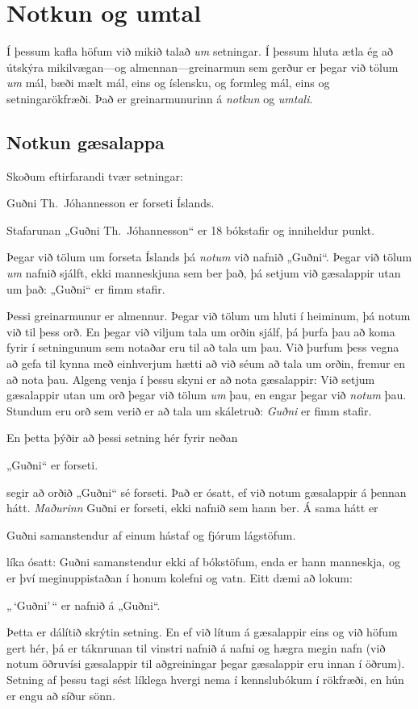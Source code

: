 \chapter{Notkun og umtal}\label{s:UseMention}

Í þessum kafla höfum við mikið talað \emph{um} setningar. Í þessum hluta ætla ég að útskýra mikilvægan---og almennan---greinarmun sem gerður er þegar við tölum \emph{um} mál, bæði mælt mál, eins og íslensku, og formleg mál, eins og setningarökfræði. Það er greinarmunurinn á \emph{notkun} og \emph{umtali}.

\section{Notkun gæsalappa}
Skoðum eftirfarandi tvær setningar:
	\begin{ebullet}
		\item Guðni Th.\ Jóhannesson er forseti Íslands.
		\item Stafarunan „Guðni Th.\ Jóhannesson“ er 18 bókstafir og inniheldur punkt.
	\end{ebullet}
Þegar við tölum um forseta Íslands þá \emph{notum} við nafnið „Guðni“. Þegar við tölum \emph{um} nafnið sjálft, ekki manneskjuna sem ber það, þá setjum við gæsalappir utan um það: „Guðni“ er fimm stafir.
	
Þessi greinarmunur er almennur. Þegar við tölum um hluti í heiminum, þá notum við til þess orð. En þegar við viljum tala um orðin sjálf, þá þurfa þau að koma fyrir í setningunum sem notaðar eru til að tala um þau. Við þurfum þess vegna að gefa til kynna með einhverjum hætti að við séum að tala um orðin, fremur en að nota þau. Algeng venja í þessu skyni er að nota gæsalappir: Við setjum gæsalappir utan um orð þegar við tölum \emph{um} þau, en engar þegar við \emph{notum} þau. Stundum eru orð sem verið er að tala um skáletruð: \emph{Guðni} er fimm stafir. 

En þetta þýðir að þessi setning	hér fyrir neðan  
	\begin{ebullet}
		\item „Guðni“ er forseti.
	\end{ebullet}
segir að orðið „Guðni“ sé forseti. Það er ósatt, ef við notum gæsalappir á þennan hátt. \emph{Maðurinn} Guðni er forseti, ekki nafnið sem hann ber. Á sama hátt er
	
	\begin{ebullet}
		\item Guðni samanstendur af einum hástaf og fjórum lágstöfum.
	\end{ebullet}
líka ósatt: Guðni samanstendur ekki af bókstöfum, enda er hann manneskja, og er því meginuppistaðan í honum kolefni og vatn. Eitt dæmi að lokum:
	\begin{ebullet}
		\item „\,`Guðni'\,“ er nafnið á „Guðni“.
	\end{ebullet} 
Þetta er dálítið skrýtin setning. En ef við lítum á gæsalappir eins og við höfum gert hér, þá er táknrunan til vinstri nafnið á nafni og hægra megin nafn (við notum öðruvísi gæsalappir til aðgreiningar þegar gæsalappir eru innan í öðrum). Setning af þessu tagi sést líklega hvergi nema í kennslubókum í rökfræði, en hún er engu að síður sönn.
	

